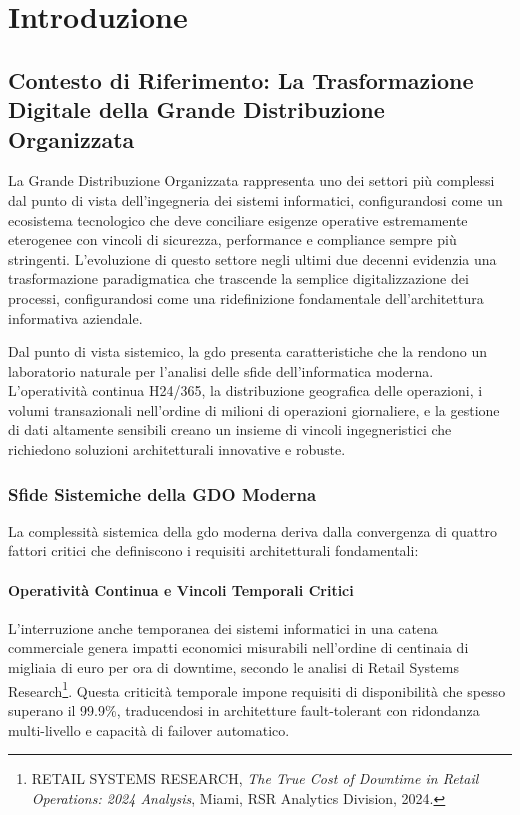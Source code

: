 \chapter{Introduzione}
\label{ch:introduzione}

\section{Contesto di Riferimento: La Trasformazione Digitale della Grande Distribuzione Organizzata}
\label{sec:contesto-gdo}

La Grande Distribuzione Organizzata rappresenta uno dei settori più complessi dal punto di vista dell'ingegneria dei sistemi informatici, configurandosi come un ecosistema tecnologico che deve conciliare esigenze operative estremamente eterogenee con vincoli di sicurezza, performance e compliance sempre più stringenti. L'evoluzione di questo settore negli ultimi due decenni evidenzia una trasformazione paradigmatica che trascende la semplice digitalizzazione dei processi, configurandosi come una ridefinizione fondamentale dell'architettura informativa aziendale.

Dal punto di vista sistemico, la \gls{gdo} presenta caratteristiche che la rendono un laboratorio naturale per l'analisi delle sfide dell'informatica moderna. L'operatività continua H24/365, la distribuzione geografica delle operazioni, i volumi transazionali nell'ordine di milioni di operazioni giornaliere, e la gestione di dati altamente sensibili creano un insieme di vincoli ingegneristici che richiedono soluzioni architetturali innovative e robuste.

\subsection{Sfide Sistemiche della GDO Moderna}
\label{subsec:sfide-sistemiche}

La complessità sistemica della \gls{gdo} moderna deriva dalla convergenza di quattro fattori critici che definiscono i requisiti architetturali fondamentali:

\subsubsection{Operatività Continua e Vincoli Temporali Critici}

L'interruzione anche temporanea dei sistemi informatici in una catena commerciale genera impatti economici misurabili nell'ordine di centinaia di migliaia di euro per ora di downtime, secondo le analisi di Retail Systems Research\footnote{RETAIL SYSTEMS RESEARCH, \textit{The True Cost of Downtime in Retail Operations: 2024 Analysis}, Miami, RSR Analytics Division, 2024.}. Questa criticità temporale impone requisiti di disponibilità che spesso superano il 99.9\%, traducendosi in architetture fault-tolerant con ridondanza multi-livello e capacità di failover automatico.

